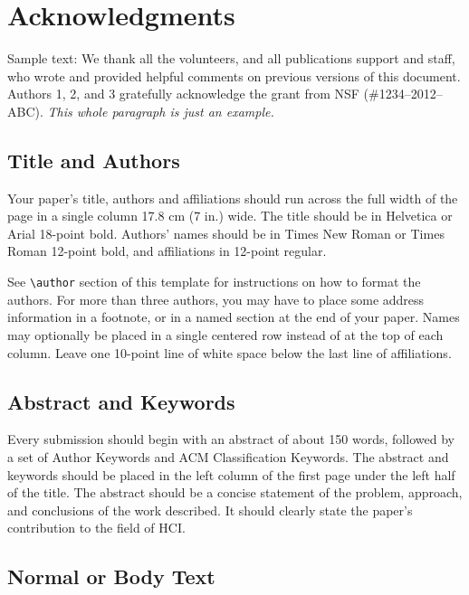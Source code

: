 \documentclass{sigchi}
\begin{document}
\section{Acknowledgments}
%
Sample text: We thank all the volunteers, and all publications support
and staff, who wrote and provided helpful comments on previous
versions of this document. Authors 1, 2, and 3 gratefully acknowledge
the grant from NSF (\#1234--2012--ABC). \textit{This whole paragraph is
  just an example.}







\subsection{Title and Authors}

Your paper's title, authors and affiliations should run across the
full width of the page in a single column 17.8 cm (7 in.) wide.  The
title should be in Helvetica or Arial 18-point bold.  Authors' names
should be in Times New Roman or Times Roman 12-point bold, and
affiliations in 12-point regular.  

See \texttt{{\textbackslash}author} section of this template for
instructions on how to format the authors. For more than three
authors, you may have to place some address information in a footnote,
or in a named section at the end of your paper. Names may optionally
be placed in a single centered row instead of at the top of each
column. Leave one 10-point line of white space below the last line of
affiliations.

\subsection{Abstract and Keywords}

Every submission should begin with an abstract of about 150 words,
followed by a set of Author Keywords and ACM Classification
Keywords. The abstract and keywords should be placed in the left
column of the first page under the left half of the title. The
abstract should be a concise statement of the problem, approach, and
conclusions of the work described. It should clearly state the paper's
contribution to the field of HCI\@.

\subsection{Normal or Body Text}
\end{document}
